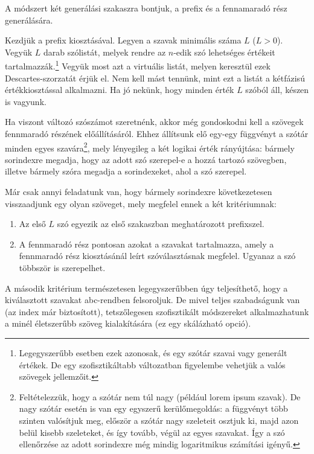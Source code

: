 \documentclass[
    parspace, %
    noindent, %
]{elteiktdk}[2023/10/30]
\begin{document}
A módszert két generálási szakaszra bontjuk, a prefix és a fennamaradó rész generálására.

Kezdjük a prefix kiosztásával.
Legyen a szavak minimális száma $L$ ($L > 0$).
Vegyük $L$ darab szólistát, melyek rendre az $n$-edik szó lehetséges értékeit tartalmazzák.\footnote{
  Legegyszerűbb esetben ezek azonosak, és egy szótár szavai vagy generált értékek.
  De egy szofisztikáltabb változatban figyelembe vehetjük a valós szövegek jellemzőit.
}
Vegyük most azt a virtuális listát, melyen keresztül ezek Descartes-szorzatát érjük el.
Nem kell mást tennünk, mint ezt a listát a kétfázisú értékkiosztással alkalmazni.
Ha jó nekünk, hogy minden érték $L$ szóból áll, készen is vagyunk.

Ha viszont változó szószámot szeretnénk,
akkor még gondoskodni kell a szövegek fennmaradó részének előállításáról.
Ehhez állítsunk elő egy-egy függvényt a szótár minden egyes szavára\footnote{
  Feltételezzük, hogy a szótár nem túl nagy (például lorem ipsum szavak).
  De nagy szótár esetén is van egy egyszerű kerülőmegoldás:
  a függvényt több szinten valósítjuk meg,
  először a szótár nagy szeleteit osztjuk ki,
  majd azon belül kisebb szeleteket, és így tovább, végül az egyes szavakat.
  Így a szó ellenőrzése az adott sorindexre még mindig logaritmikus számítási igényű.
}, mely lényegileg a két logikai érték rányújtása:
bármely sorindexre megadja, hogy az adott szó szerepel-e a hozzá tartozó szövegben,
illetve bármely szóra megadja a sorindexeket, ahol a szó szerepel.

Már csak annyi feladatunk van, hogy bármely sorindexre következetesen visszaadjunk egy olyan szöveget,
mely megfelel ennek a két kritériumnak:

\begin{enumerate}
  \item Az első $L$ szó egyezik az első szakaszban meghatározott prefixszel.
  \item A fennmaradó rész pontosan azokat a szavakat tartalmazza,
        amely a fennmaradó rész kiosztásánál leírt szóválasztásnak megfelel.
        Ugyanaz a szó többször is szerepelhet.
\end{enumerate}

A második kritérium természetesen legegyszerűbben úgy teljesíthető,
hogy a kiválasztott szavakat abc-rendben felsoroljuk.
De mivel teljes szabadságunk van (az index már biztosított),
tetszőlegesen szofisztikált módszereket alkalmazhatunk a minél életszerűbb szöveg kialakítására
(ez egy skálázható opció).
\end{document}
